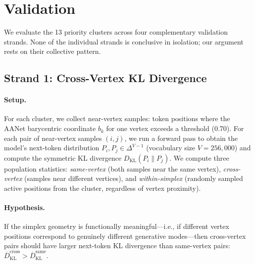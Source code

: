 \documentclass{article}
\begin{document}
\section{Validation}
\label{sec:validation}

We evaluate the 13 priority clusters across four complementary validation strands.
None of the individual strands is conclusive in isolation; our argument rests on
their collective pattern.

\subsection{Strand 1: Cross-Vertex KL Divergence}
\label{sec:kl}

\paragraph{Setup.}  For each cluster, we collect near-vertex samples: token
positions where the AANet barycentric coordinate $b_k$ for one vertex exceeds a
threshold (0.70).  For each pair of near-vertex samples $(i, j)$, we run a forward
pass to obtain the model's next-token distribution $P_i, P_j \in \Delta^{V-1}$
(vocabulary size $V = 256{,}000$) and compute the symmetric KL divergence
$D_{\mathrm{KL}}(P_i \| P_j)$.  We compute three population statistics:
\emph{same-vertex} (both samples near the same vertex), \emph{cross-vertex}
(samples near different vertices), and \emph{within-simplex} (randomly sampled
active positions from the cluster, regardless of vertex proximity).

\paragraph{Hypothesis.}  If the simplex geometry is functionally meaningful---i.e.,
if different vertex positions correspond to genuinely different generative modes---then
cross-vertex pairs should have larger next-token KL divergence than same-vertex pairs:
$\overline{D}_{\mathrm{KL}}^{\mathrm{cross}} > \overline{D}_{\mathrm{KL}}^{\mathrm{same}}$.
\end{document}
